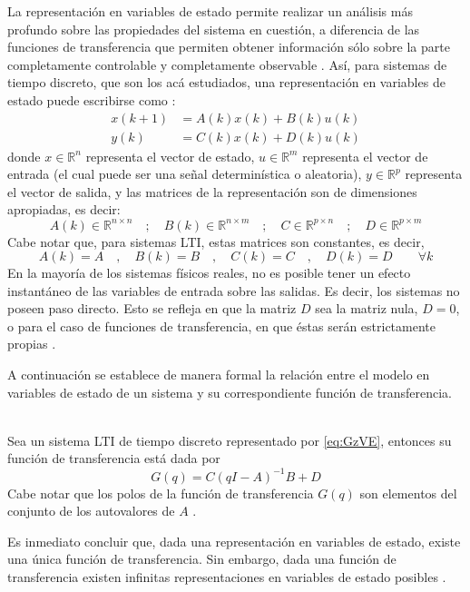 La representaci\'on en variables de estado permite realizar un an\'alisis m\'as profundo sobre las propiedades del sistema en cuesti\'on, a diferencia de las funciones de transferencia que permiten obtener informaci\'on s\'olo sobre la parte completamente controlable y completamente observable \cite{hendricks2009linear}. As\'i, para sistemas de tiempo discreto, que son los ac\'a estudiados, una representaci\'on en variables de estado puede escribirse como \cite{antsaklis2007linear}:
\begin{subequations}\label{eq:GzVE}
\begin{align}
x(k+1)&=A(k)x(k)+B(k)u(k)\\
y(k)&=C(k)x(k)+D(k)u(k)
\end{align}
\end{subequations}
donde $x \in \mathbb{R}^n$ representa el vector de estado, $u \in \mathbb{R}^m$ representa el vector de entrada (el cual puede ser una se\~nal determin\'istica o aleatoria), $y \in \mathbb{R}^p$ representa el vector de salida, y las matrices de la representaci\'on son de dimensiones apropiadas, es decir:
\begin{equation}
A(k) \in \mathbb{R}^{n\times n}\quad ;\quad B(k) \in \mathbb{R}^{n\times m}\quad ; \quad C\in \mathbb{R}^{p\times n}\quad ; \quad D\in \mathbb{R}^{p\times m}
\end{equation}
Cabe notar que, para sistemas LTI, estas matrices son constantes, es decir,
\begin{equation}
A(k)=A\quad , \quad B(k)=B\quad , \quad C(k)=C\quad , \quad D(k)=D\qquad \forall k
\end{equation}
En la mayor\'ia de los sistemas f\'isicos reales, no es posible tener un efecto instant\'aneo de las variables de entrada sobre las salidas. Es decir, los sistemas no poseen paso directo. Esto se refleja en que la matriz $D$ sea la matriz nula, $D=0$, o para el caso de funciones de transferencia, en que \'estas ser\'an estrictamente propias \cite{hinrichsen2005mathematical}.

A continuaci\'on se establece de manera formal la relaci\'on entre el modelo en variables de estado de un sistema y su correspondiente funci\'on de transferencia.
\begin{lema}\label{lema:VE-transf}{\ \\}
Sea un sistema LTI de tiempo discreto representado por \eqref{eq:GzVE}, entonces su funci\'on de transferencia est\'a dada por
\begin{equation}\label{eq:Gtf}
G(q)=C \left(qI-A\right)^{-1}B+D
\end{equation}
Cabe notar que los polos de la funci\'on de transferencia $G(q)$ son elementos del conjunto de los autovalores de $A$ \cite{gogrsa01}.\QED
\end{lema}
Es inmediato concluir que, dada una representaci\'on en variables de estado, existe una única funci\'on de transferencia. Sin embargo, dada una funci\'on de transferencia existen infinitas representaciones en variables de estado posibles \cite{zhdogl96}.

